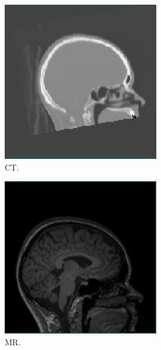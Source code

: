 \begin{figure}
    \centering
    \begin{subfigure}{0.3\textwidth}
        \centering
        \includegraphics[width=0.75\textwidth]{billeder/ct.png}
        \caption{CT.}
        \label{eksempel:ct}
    \end{subfigure}\hfill
    \begin{subfigure}{0.3\textwidth}
        \centering
        \includegraphics[width=0.75\textwidth]{billeder/mr.png}
        \caption{MR.}
        \label{eksempel:mr}
    \end{subfigure}\hfill
    \begin{subfigure}{0.3\textwidth}
        \centering

\end{subfigure}
\end{figure}
